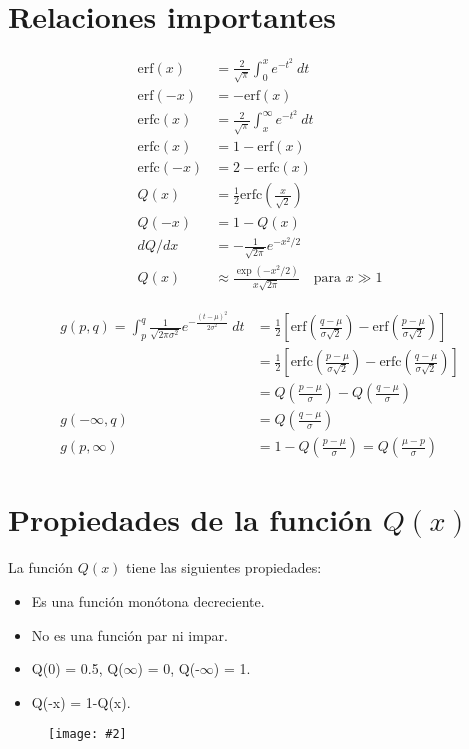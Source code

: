 \documentclass{article}
\newcommand{\fig}[3][1.0]{
    \begin{figure}[!ht]
        \centering
        \texttt{[image: \#2]}
        \caption{#3}
        \label{fig:#2}
    \end{figure}
}
\begin{document}
\section{Relaciones importantes}
    \begin{align}
        \text{erf}(x) &= \frac{2}{\sqrt{\pi}}\int_{0}^{x}e^{-t^2}\:dt\\
        \text{erf}(-x) &= -\text{erf}(x) \\
        \text{erfc}(x) &= \frac{2}{\sqrt{\pi}}\int_{x}^{\infty}e^{-t^2}\:dt\\
        \text{erfc}(x) &= 1-\text{erf}(x) \\
        \text{erfc}(-x) &= 2-\text{erfc}(x) \\
        Q(x) &= \frac{1}{2}\text{erfc}\left( \frac{x}{\sqrt{2}} \right)\\
        Q(-x) &= 1-Q(x) \\
        dQ/dx &= -\frac{1}{\sqrt{2\pi}}e^{-x^2/2}\\
        Q(x) &\approx \frac{\exp{(-x^2/2)}}{x\sqrt{2\pi}} \quad \text{para } x \gg 1
    \end{align}

    \begin{align}
        g(p,q) = \int_{p}^{q}\frac{1}{\sqrt{2\pi\sigma^2}}e^{-\frac{(t-\mu)^2}{2\sigma^2}}\:dt &= \frac{1}{2}\left[ \text{erf}\left(\frac{q-\mu}{\sigma\sqrt{2}}\right) - \text{erf}\left(\frac{p-\mu}{\sigma\sqrt{2}}\right) \right] \nonumber \\
        &= \frac{1}{2}\left[ \text{erfc}\left(\frac{p-\mu}{\sigma\sqrt{2}}\right) - \text{erfc}\left(\frac{q-\mu}{\sigma\sqrt{2}}\right) \right] \nonumber \\
        &= Q\left(\frac{p-\mu}{\sigma}\right) - Q\left(\frac{q-\mu}{\sigma}\right)\\
        g(-\infty,q) &= Q\left(\frac{q-\mu}{\sigma}\right)\\
        g(p,\infty) &= 1-Q\left(\frac{p-\mu}{\sigma}\right) = Q\left(\frac{\mu-p}{\sigma}\right)
    \end{align}

\section{Propiedades de la función $Q(x)$}
    La función $Q(x)$ tiene las siguientes propiedades:
    \begin{itemize}
        \item Es una función monótona decreciente.
        \item No es una función par ni impar.
        \item Q(0) = 0.5, Q($\infty$) = 0, Q(-$\infty$) = 1.
        \item Q(-x) = 1-Q(x).
    \end{itemize}  
    \fig[0.9]{Q}{}  
\end{document}
